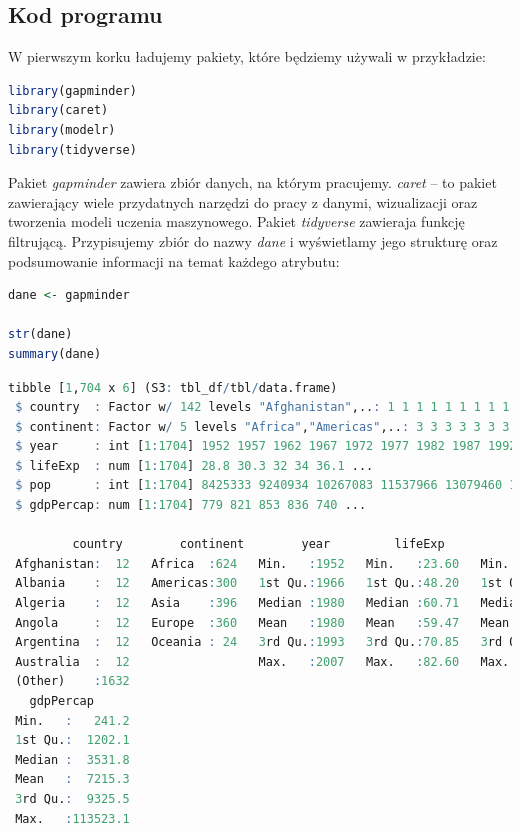 \documentclass[a4paper]{article}
\begin{document}
\subsection{Kod programu}
W pierwszym korku ładujemy pakiety, które będziemy używali w przykładzie:
\begin{lstlisting}[language=R, frame=single]
library(gapminder)
library(caret)
library(modelr)
library(tidyverse)
\end{lstlisting}
Pakiet \textit{gapminder} zawiera zbiór danych, na którym pracujemy. \textit{caret} -- to pakiet zawierający wiele przydatnych narzędzi do pracy z danymi, wizualizacji oraz tworzenia modeli uczenia maszynowego.  Pakiet \textit{tidyverse} zawieraja funkcję filtrującą. Przypisujemy zbiór do nazwy \textit{dane} i wyświetlamy  jego strukturę oraz podsumowanie informacji na temat każdego atrybutu:
\begin{lstlisting}[language=R,frame=single]
dane <- gapminder

str(dane)
summary(dane)
\end{lstlisting}
\begin{lstlisting}[language=R,frame=single]
tibble [1,704 x 6] (S3: tbl_df/tbl/data.frame)
 $ country  : Factor w/ 142 levels "Afghanistan",..: 1 1 1 1 1 1 1 1 1 1 ...
 $ continent: Factor w/ 5 levels "Africa","Americas",..: 3 3 3 3 3 3 3 3 3 3 ...
 $ year     : int [1:1704] 1952 1957 1962 1967 1972 1977 1982 1987 1992 1997 ...
 $ lifeExp  : num [1:1704] 28.8 30.3 32 34 36.1 ...
 $ pop      : int [1:1704] 8425333 9240934 10267083 11537966 13079460 14880372 12881816 13867957 16317921 22227415 ...
 $ gdpPercap: num [1:1704] 779 821 853 836 740 ...
 
         country        continent        year         lifeExp           pop           
 Afghanistan:  12   Africa  :624   Min.   :1952   Min.   :23.60   Min.   :6.001e+04  
 Albania    :  12   Americas:300   1st Qu.:1966   1st Qu.:48.20   1st Qu.:2.794e+06  
 Algeria    :  12   Asia    :396   Median :1980   Median :60.71   Median :7.024e+06  
 Angola     :  12   Europe  :360   Mean   :1980   Mean   :59.47   Mean   :2.960e+07  
 Argentina  :  12   Oceania : 24   3rd Qu.:1993   3rd Qu.:70.85   3rd Qu.:1.959e+07  
 Australia  :  12                  Max.   :2007   Max.   :82.60   Max.   :1.319e+09  
 (Other)    :1632                                                                    
   gdpPercap       
 Min.   :   241.2  
 1st Qu.:  1202.1  
 Median :  3531.8  
 Mean   :  7215.3  
 3rd Qu.:  9325.5  
 Max.   :113523.1 
\end{lstlisting}
\end{document}

